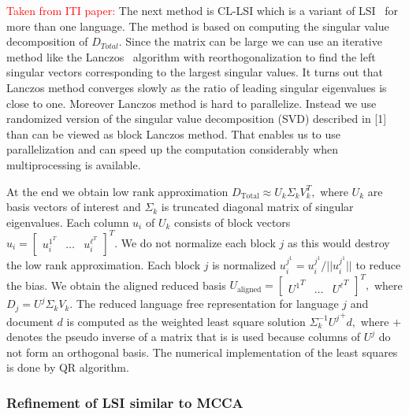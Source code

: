\documentclass[twoside,11pt]{article}
\newcommand{\oldText}[1]{\textcolor{red}{#1:}\color{blue}}
\begin{document}
{\oldText{Taken from ITI paper}
The next method is CL-LSI which is a variant of LSI~\cite{lsi} for more than one language. The method is based on computing the singular value decomposition of $D_{Total}$. Since the matrix can be large we can use an iterative method like the Lanczos~\cite{matrix_comp} algorithm with reorthogonalization to find the left singular vectors corresponding to the largest singular values. It turns out that Lanczos method converges slowly as the ratio of leading singular eigenvalues is close to one. Moreover Lanczos method is hard to parallelize. Instead we use randomized version of the singular value decomposition (SVD) described in [1] than can be viewed as block Lanczos method. That enables us to use parallelization and can speed up the computation considerably when multiprocessing is available.

At the end we obtain low rank approximation $D_{\mbox{Total}} \approx U_k \Sigma_k V_k^T,$ where $U_k$ are basis vectors of interest and $\Sigma_k$ is truncated diagonal matrix of singular eigenvalues. Each column $u_i$ of $U_k$ consists of block vectors $u_i = \begin{bmatrix} u^{1^T}_i & \dots & u^{\ell^T}_i \end{bmatrix}^T.$ We do not normalize each block $j$  as this would destroy the low rank approximation. Each block $j$ is normalized $u^{j^1}_i = u^{j^1}_i/||u^{j^1}_i||$ to reduce the bias. We obtain the aligned reduced basis $U_{\textrm{aligned}} = \begin{bmatrix} {U^1}^T &\dots & {U^\ell}^T \end{bmatrix}^T,$ where $D_j =  U^j \Sigma_k V_k.$ The reduced language free representation for language $j$ and document $d$ is computed as the weighted least square solution $\Sigma_k^{-1} {U^j}^+ d,$ where $+$ denotes the pseudo inverse of a matrix that is is used because columns of $U^j$ do not form an orthogonal basis. The numerical implementation of the least squares is done by QR algorithm.
}

\subsubsection{Refinement of LSI similar to MCCA}
\end{document}
